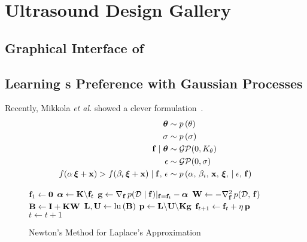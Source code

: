 
\section{Ultrasound Design Gallery}\label{section:method}

\subsection{Graphical Interface of \usdg}\label{section:ui}

\subsection{Learning {\user}s Preference with Gaussian Processes}\label{section:gp}

Recently, Mikkola \textit{et al.} showed a clever formulation~\cite{pmlr-v119-mikkola20a}.
\begin{align*}
\bm{\theta}                 &\sim p\,(\theta) \\
\sigma                  &\sim p\,(\sigma) \\
\mathbf{f} \mid \bm{\theta}        &\sim \mathcal{GP}(0, K_{\theta}) \\
\epsilon                &\sim \mathcal{GP}(0, \sigma) \\
  f(\alpha\,\bm{\xi} + \mathbf{x}) > f(\beta_i \,\bm{\xi} + \mathbf{x}) \mid \mathbf{f},\, \epsilon
  &\sim p\,(\alpha,\, \beta_i,\, \mathbf{x},\,\bm{\xi},\, \mid \epsilon,\, \mathbf{f})  \\
\end{align*}

\begin{figure}[t]
  \removelatexerror
  \begin{algorithm2e}[H]
    \DontPrintSemicolon
    \SetAlgoLined
    \( \mathbf{f}_1 \leftarrow \mathbf{0} \)\;
     {
      \(\bm{\alpha}        \leftarrow \mathbf{K}\backslash\mathbf{f}_{t} \)\;
      \(\mathbf{g}            \leftarrow \nabla_{\mathbf{f}}\, p(\mathcal{D}\mid\mathbf{f})|_{\mathbf{f} = \mathbf{f}_t} - \bm{\alpha} \)\;
      \(\mathbf{W}            \leftarrow -  \nabla^2_{\mathbf{f}}\, p(\mathcal{D},\, \mathbf{f}) \)\;
      \(\mathbf{B}           \leftarrow \mathbf{I} + \mathbf{K} \mathbf{W} \)\;
      \(\mathbf{L}, \mathbf{U}      \leftarrow \mathrm{lu}\,(\mathbf{B}) \)\;
      \(\mathbf{p}           \leftarrow \mathbf{L} \backslash \mathbf{U} \backslash \mathbf{K} \mathbf{g} \)\;
      \(\mathbf{f}_{t+1}      \leftarrow \mathbf{f}_t + \eta \, \mathbf{p} \)\;
      \(t \leftarrow t + 1\)\;
    }
    \caption{Newton's Method for Laplace's Approximation}\label{alg:newton}
  \end{algorithm2e}
\end{figure}
%
